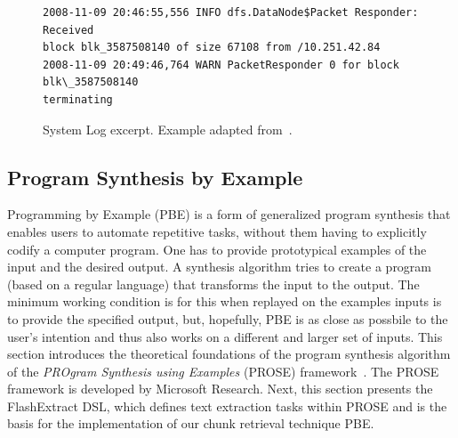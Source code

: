 \begin{figure}[!t]
  \centering
  \begin{lstlisting}[breaklines=true]
2008-11-09 20:46:55,556 INFO dfs.DataNode$Packet Responder: Received
block blk_3587508140 of size 67108 from /10.251.42.84
2008-11-09 20:49:46,764 WARN PacketResponder 0 for block blk\_3587508140
terminating
  \end{lstlisting}
  \caption{System Log excerpt.
Example adapted from~\cite{he2017towards}.}
  \label{lst:system-log}
\end{figure}

\subsection{Program Synthesis by Example}
\label{sec:rw-prose}

Programming by Example (PBE) is a form of generalized program
synthesis that enables users to automate repetitive tasks, without
them having to explicitly codify a computer program.
One has to
provide prototypical examples of the input and the desired output.
A
synthesis algorithm tries to create a program (based on a regular
language) that transforms the input to the output.
The minimum working
condition is for this when replayed on the examples inputs is to
provide the specified output, but, hopefully, PBE is as close as
possbile to the user's intention and thus also works on a different
and larger set of inputs.
This section introduces the theoretical
foundations of the program synthesis algorithm of the \emph{PROgram
Synthesis using Examples} (PROSE) framework~\cite{prose2019webpage}.
The PROSE framework is developed by Microsoft Research.
Next, this
section presents the FlashExtract DSL, which defines text extraction
tasks within PROSE and is the basis for the implementation of our
chunk retrieval technique PBE\@.

